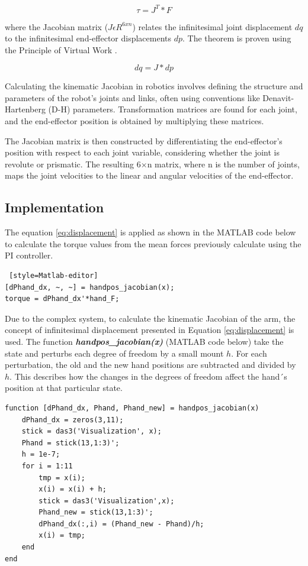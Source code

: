 \begin{equation}
    \tau = J^T*F
\end{equation}

where the Jacobian matrix ($J \epsilon R^{6xn}$) relates the infinitesimal joint displacement $dq$ to the infinitesimal end-effector displacements $dp$. The theorem is proven using the Principle of Virtual Work \cite{ITR}.

\begin{equation}\label{eq:displacement}
    dq = J*dp
\end{equation} 

Calculating the kinematic Jacobian in robotics involves defining the structure and parameters of the robot's joints and links, often using conventions like Denavit-Hartenberg (D-H) parameters. Transformation matrices are found for each joint, and the end-effector position is obtained by multiplying these matrices.

The Jacobian matrix is then constructed by differentiating the end-effector's position with respect to each joint variable, considering whether the joint is revolute or prismatic. The resulting 6×n matrix, where n is the number of joints, maps the joint velocities to the linear and angular velocities of the end-effector.

\subsection{Implementation}
The equation \ref{eq:displacement} is applied as shown in the MATLAB code below to calculate the torque values from the mean forces previously calculate using the PI controller. 

\begin{lstlisting} [style=Matlab-editor]
[dPhand_dx, ~, ~] = handpos_jacobian(x);
torque = dPhand_dx'*hand_F;
\end{lstlisting}

Due to the complex system, to calculate the kinematic Jacobian of the arm, the concept of infinitesimal displacement presented in Equation \ref{eq:displacement} is used. The function \textbf{\textit{handpos\_jacobian(x)}} (MATLAB code below) take the state and perturbs each degree of freedom by a small mount $h$. For each perturbation, the old and the new hand positions are  subtracted and divided by $h$. This describes how the changes in the degrees of freedom affect the hand´s position at that particular state. 

\begin{lstlisting}[style=Matlab-editor]
function [dPhand_dx, Phand, Phand_new] = handpos_jacobian(x)
    dPhand_dx = zeros(3,11);
    stick = das3('Visualization', x);
    Phand = stick(13,1:3)';
    h = 1e-7;
    for i = 1:11
        tmp = x(i);
        x(i) = x(i) + h;
        stick = das3('Visualization',x);
        Phand_new = stick(13,1:3)';
        dPhand_dx(:,i) = (Phand_new - Phand)/h;
        x(i) = tmp;
    end        
end
\end{lstlisting}

